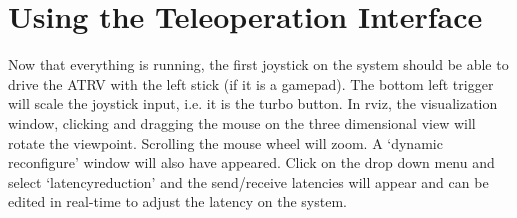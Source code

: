 \documentclass[12pt]{report}
\begin{document}
\section{Using the Teleoperation Interface}
Now that everything is running, the first joystick on the system should be able to drive the ATRV with the left stick (if it is a gamepad).  The bottom left trigger will scale the joystick input, i.e. it is the turbo button.  In rviz, the visualization window, clicking and dragging the mouse on the three dimensional view will rotate the viewpoint.  Scrolling the mouse wheel will zoom.  A `dynamic reconfigure' window will also have appeared.  Click on the drop down menu and select `latency\textunderscore{}reduction' and the send/receive latencies will appear and can be edited in real-time to adjust the latency on the system.
\end{document}
